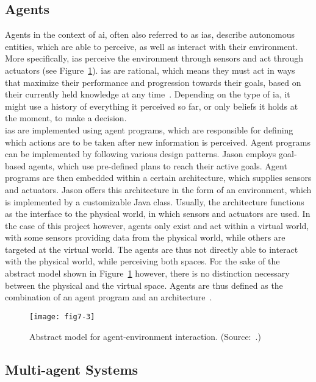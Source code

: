 \documentclass[draft,final]{vutinfth} %
\begin{document}
\subsection{Agents}
\label{chap:agents}

Agents in the context of \gls{ai}, often also referred to as \glspl{ia}, describe autonomous entities, which are able to perceive, as well as interact with their environment. 
More specifically, \glspl{ia} perceive the environment through sensors and act through actuators (see Figure~\ref{fig:fig71_agentinteraction}). 
\Glspl{ia} are rational, which means they must act in ways that maximize their performance and progression towards their goals, based on their currently held knowledge at any time~\cite{russell2016artificial}. 
Depending on the type of \gls{ia}, it might use a history of everything it perceived so far, or only beliefs it holds at the moment, to make a decision. \\
\Glspl{ia} are implemented using agent programs, which are responsible for defining which actions are to be taken after new information is perceived. 
Agent programs can be implemented by following various design patterns. 
Jason employs goal-based agents, which use pre-defined plans to reach their active goals. 
Agent programs are then embedded within a certain architecture, which supplies sensors and actuators.
Jason offers this architecture in the form of an environment, which is implemented by a customizable Java class. 
Usually, the architecture functions as the interface to the physical world, in which sensors and actuators are used. 
In the case of this project however, agents only exist and act within a virtual world, with some sensors providing data from the physical world, while others are targeted at the virtual world. 
The agents are thus not directly able to interact with the physical world, while perceiving both spaces. 
For the sake of the abstract model shown in Figure~\ref{fig:fig71_agentinteraction} however, there is no distinction necessary between the physical and the virtual space. 
Agents are thus defined as the combination of an agent program and an architecture~\cite{russell2016artificial}. 
\begin{figure}[h]
	\centering
	\texttt{[image: fig7-3]}
	\caption{Abstract model for agent-environment interaction. (Source:~\cite[p.~35]{russell2016artificial}.)}
	\label{fig:fig71_agentinteraction}
\end{figure}

\subsection{Multi-agent Systems}
\label{chap:mas}
\end{document}
